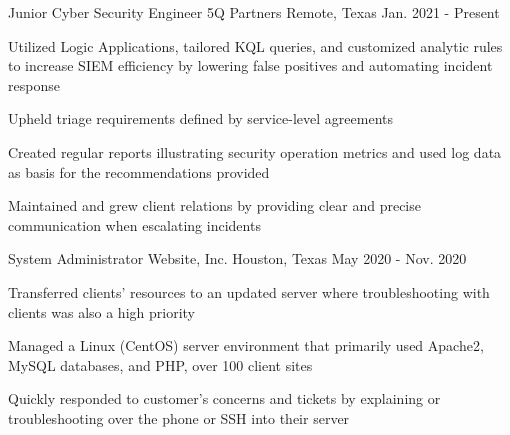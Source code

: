 \begin{cventries}
\cventry
  {Junior Cyber Security Engineer} %
  {5Q Partners} %
  {Remote, Texas} %
  {Jan. 2021 - Present} %
  {
    \begin{cvitems}
      \item {Utilized Logic Applications, tailored KQL queries, and customized analytic rules to increase SIEM efficiency by lowering false positives and automating incident response} 
      \item {Upheld triage requirements defined by service-level agreements}
      \item {Created regular reports illustrating security operation metrics and used log data as basis for the recommendations provided}
      \item {Maintained and grew client relations by providing clear and precise communication when escalating incidents}
    \end{cvitems}
  }
\cventry
  {System Administrator} %
  {Website, Inc.} %
  {Houston, Texas} %
  {May 2020 - Nov. 2020} %
  {
    \begin{cvitems}
      \item{Transferred clients' resources to an updated server where troubleshooting with clients was also a high priority}
      \item {Managed a Linux (CentOS) server environment that primarily used Apache2, MySQL databases, and PHP, over 100 client sites}
      \item {Quickly responded to customer's concerns and tickets by explaining or troubleshooting over the phone or SSH into their server}
    \end{cvitems}
  }
  \end{cventries}
